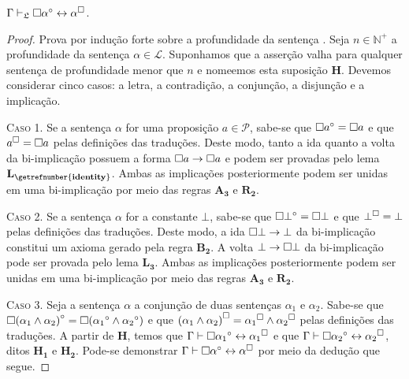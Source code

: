 \vspace{\baselineskip}
\begin{tcolorbox}[enhanced jigsaw, breakable, sharp corners, colframe=black, colback=white, boxrule=0.5pt, left=1.5mm, right=1.5mm, top=1.5mm, bottom=1.5mm]
\begin{theorem}\label{biimplication}
    $\Gamma\mathrel{\vdash}_\mathfrak{L}\Box\alpha^\circ\leftrightarrow\alpha^\Box$.

    \begin{proof}
        Prova por indução forte sobre a profundidade da sentença \citep{Troelstra}.
        Seja $n\in\mathbb{N}^+$ a profundidade da sentença $\alpha\in\mathcal{L}$.
        Suponhamos que a asserção valha para qualquer sentença de profundidade menor que $n$ e nomeemos esta suposição $\mathbf{H}$.
        Devemos considerar cinco casos: a letra, a contradição, a conjunção, a disjunção e a implicação.

        \vspace{.5\baselineskip}
        \textsc{Caso 1.}
        Se a sentença $\alpha$ for uma proposição $a\in\mathcal{P}$, sabe-se que $\Box a^\circ=\Box a$ e que $a^\Box=\Box a$ pelas definições das traduções.
        Deste modo, tanto a ida quanto a volta da bi-implicação possuem a forma $\Box a\to\Box a$ e podem ser provadas pelo lema \hyperref[identity]{$\mathbf{L_\getrefnumber{identity}}$}.
        Ambas as implicações posteriormente podem ser unidas em uma bi-implicação por meio das regras \hyperref[MA3]{$\mathbf{A_3}$} e \hyperref[detachment]{$\mathbf{R_2}$}.

        \vspace{.5\baselineskip}
        \textsc{Caso 2.}
        Se a sentença $\alpha$ for a constante $\bot$, sabe-se que $\Box\bot^\circ=\Box\bot$ e que $\bot^\Box=\bot$ pelas definições das traduções.
        Deste modo, a ida $\Box\bot\to\bot$ da bi-implicação constitui um axioma gerado pela regra \hyperref[MB2]{$\mathbf{B_2}$}.
        A volta $\bot\to\Box\bot$ da bi-implicação pode ser provada pelo lema \hyperref[explosion]{$\mathbf{L_3}$}.
        Ambas as implicações posteriormente podem ser unidas em uma bi-implicação por meio das regras \hyperref[MA3]{$\mathbf{A_3}$} e \hyperref[detachment]{$\mathbf{R_2}$}.

        \vspace{.5\baselineskip}
        \textsc{Caso 3.}
        Seja a sentença $\alpha$ a conjunção de duas sentenças ${\alpha_1}$ e ${\alpha_2}$.
        Sabe-se que $\Box{({\alpha_1}\wedge{\alpha_2})}^\circ=\Box({\alpha_1}^\circ\wedge{\alpha_2}^\circ)$ e que ${({\alpha_1}\wedge{\alpha_2})}^\Box={\alpha_1}^\Box\wedge{\alpha_2}^\Box$ pelas definições das traduções.
        A partir de $\mathbf{H}$, temos que $\Gamma\mathrel{\vdash}\Box{\alpha_1}^\circ\leftrightarrow{\alpha_1}^\Box$ e que $\Gamma\mathrel{\vdash}\Box{\alpha_2}^\circ\leftrightarrow{\alpha_2}^\Box$, ditos $\mathbf{H_1}$ e $\mathbf{H_2}$.
        Pode-se demonstrar $\Gamma\mathrel{\vdash}\Box\alpha^\circ\leftrightarrow\alpha^\Box$ por meio da dedução que segue.


\end{proof}
\end{theorem}
\end{tcolorbox}
